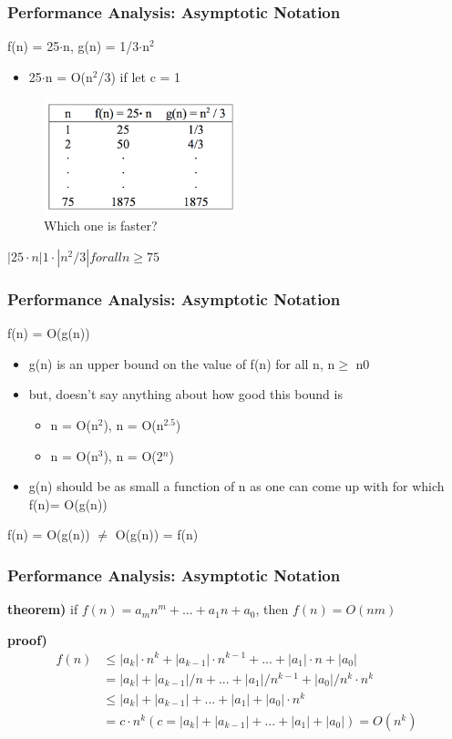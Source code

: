 \documentclass[newPxFont,sthlmFooter,nooffset]{beamer}
\begin{document}
\begin{frame}[t]
  \frametitle{Performance Analysis: Asymptotic Notation}
 f(n) = 25$\cdot$n, g(n) = 1/3$\cdot$n$^2$ 
\begin{itemize}
\item 25$\cdot$n = O(n$^2$/3) if let c = 1
\end{itemize}

  \begin{figure}[h]
    \centering
    \includegraphics[width=0.5\textwidth]{figures/fig06_accel.png}
    \caption{Which one is faster?}
  \end{figure}
$ |25\cdot n|   1\cdot|n^2/3| for all n \geq  75$
\end{frame}

\begin{frame}[t]
  \frametitle{Performance Analysis: Asymptotic Notation}
f(n) = O(g(n))
\begin{itemize}
\item g(n) is an upper bound on the value of f(n) for all n, n$\geq$ n0
\item  but, doesn’t say anything about how good this bound is
  \begin{itemize}
  \item n = O(n$^2$), n = O(n$^{2.5}$)
  \item n = O(n$^3$), n = O(2$^n$)
  \end{itemize}

\item g(n) should be as small a function
  of n as one can come up with for which f(n)= O(g(n))
\end{itemize}

f(n) = O(g(n)) $\neq$  O(g(n)) = f(n)
\end{frame}

\begin{frame}[t]
  \frametitle{Performance Analysis: Asymptotic Notation}
\textbf{theorem)} if $f(n) = a_{m}n^m + ... + a_1n + a_0$, then $f(n) = O(nm)$

\textbf{proof)}
\begin{align*}
f(n) &\leq  |a_k|·n^k + |a_{k-1}|·n^{k-1} +...+ |a_1|\cdot n + |a_0| \\
& = {|a_k| + |a_{k-1}|/n +...+ |a_1|/n^{k-1}+ |a_0|/n^k}\cdot n^k \\
& \leq  {|a_k| + |a_{k-1}| +...+ |a_1| + |a_0|}\cdot n^k \\
& = c\cdot n^k (c = |a_k|+|a_{k-1}|+...+|a_1|+|a_0|) = O(n^k)
\end{align*}
\end{frame}
\end{document}
